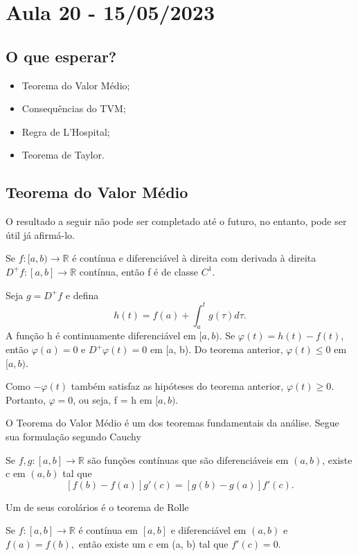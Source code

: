 \documentclass[Analysis/analysis_notes.tex]{subfiles}
\begin{document}
\section{Aula 20 - 15/05/2023}
\subsection{O que esperar?}
\begin{itemize}
	\item Teorema do Valor Médio;
	\item Consequências do TVM;
	\item Regra de L'Hospital;
	\item Teorema de Taylor.
\end{itemize}
\subsection{Teorema do Valor Médio}
O resultado a seguir não pode ser completado até o futuro, no entanto, pode
ser útil já afirmá-lo.
\hypertarget{incomplete_1}{\begin{crl*}
		Se \(f:[a, b)\rightarrow \mathbb{R}\) é contínua e diferenciável à direita com
		derivada à direita \(D^{+}f:[a, b]\rightarrow \mathbb{R}\) contínua, então f é de classe
		\(C^{1}\).
	\end{crl*}}
\begin{proof*}
	Seja \(g = D^{+}f\) e defina
	\[
		h(t) = f(a) + \int_{a}^{t} g(\tau )d\tau.
	\]
	A fun\c cão h é continuamente diferenciável em \([a, b)\). Se \(\varphi (t) = h(t)-f(t)\),
	então \(\varphi (a) = 0\) e \(D^{+}\varphi (t) = 0\) em [a, b). Do teorema anterior,
	\(\varphi (t)\leq 0\) em \([a, b)\).

	Como \(-\varphi (t)\) também satisfaz as hipóteses do teorema anterior, \(\varphi (t)\geq 0\).
	Portanto, \(\varphi = 0\), ou seja, f = h em \([a, b)\). \qedsymbol
\end{proof*}
O Teorema do Valor Médio é um dos teoremas fundamentais da análise. Segue sua formula\c cão segundo
Cauchy
\hypertarget{cauchy_mvt}{
	\begin{theorem*}
		Se \(f, g:[a, b]\rightarrow \mathbb{R}\) são fun\c cões contínuas que são
		diferenciáveis em \((a, b)\), existe c em \((a, b)\) tal que
		\[
			[f(b)-f(a)]g'(c) = [g(b)-g(a)]f'(c).
		\]
	\end{theorem*}}
Um de seus corolários é o teorema de Rolle
\hypertarget{Rolle}{
	\begin{crl*}
		Se \(f:[a, b]\rightarrow \mathbb{R}\) é contínua em \([a, b]\) e diferenciável
		em \((a, b)\) e \(f(a)=f(b),\) então existe um c em (a, b) tal que \(f'(c) = 0.\)
	\end{crl*}}
\end{document}
